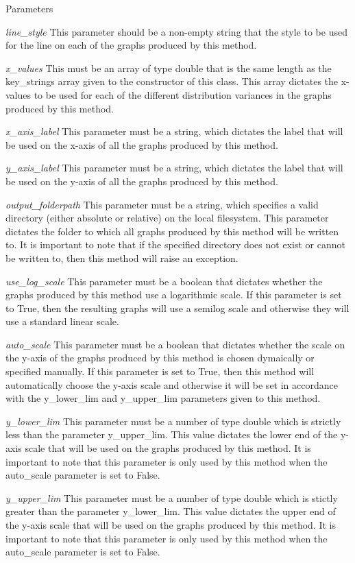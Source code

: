 \begin{DoxyParams}{Parameters}
\item[{\em line\_\-style}]This parameter should be a non-\/empty string that the style to be used for the line on each of the graphs produced by this method. \item[{\em x\_\-values}]This must be an array of type double that is the same length as the key\_\-strings array given to the constructor of this class. This array dictates the x-\/values to be used for each of the different distribution variances in the graphs produced by this method. \item[{\em x\_\-axis\_\-label}]This parameter must be a string, which dictates the label that will be used on the x-\/axis of all the graphs produced by this method. \item[{\em y\_\-axis\_\-label}]This parameter must be a string, which dictates the label that will be used on the y-\/axis of all the graphs produced by this method. \item[{\em output\_\-folderpath}]This parameter must be a string, which specifies a valid directory (either absolute or relative) on the local filesystem. This parameter dictates the folder to which all graphs produced by this method will be written to. It is important to note that if the specified directory does not exist or cannot be written to, then this method will raise an exception. \item[{\em use\_\-log\_\-scale}]This parameter must be a boolean that dictates whether the graphs produced by this method use a logarithmic scale. If this parameter is set to True, then the resulting graphs will use a semilog scale and otherwise they will use a standard linear scale. \item[{\em auto\_\-scale}]This parameter must be a boolean that dictates whether the scale on the y-\/axis of the graphs produced by this method is chosen dymaically or specified manually. If this parameter is set to True, then this method will automatically choose the y-\/axis scale and otherwise it will be set in accordance with the y\_\-lower\_\-lim and y\_\-upper\_\-lim parameters given to this method. \item[{\em y\_\-lower\_\-lim}]This parameter must be a number of type double which is strictly less than the parameter y\_\-upper\_\-lim. This value dictates the lower end of the y-\/axis scale that will be used on the graphs produced by this method. It is important to note that this parameter is only used by this method when the auto\_\-scale parameter is set to False. \item[{\em y\_\-upper\_\-lim}]This parameter must be a number of type double which is stictly greater than the parameter y\_\-lower\_\-lim. This value dictates the upper end of the y-\/axis scale that will be used on the graphs produced by this method. It is important to note that this parameter is only used by this method when the auto\_\-scale parameter is set to False. \end{DoxyParams}
